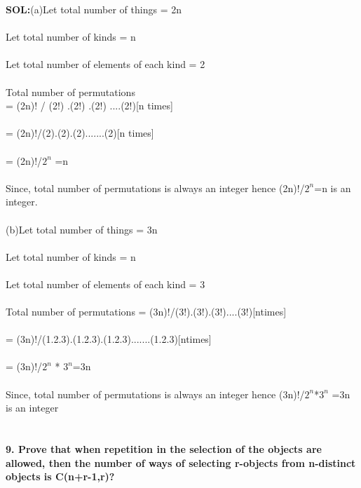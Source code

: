 \documentclass[8pt,a4paper]{article}
\begin{document}
\textbf{SOL:}(a)Let total number of things = 2n\\
\\Let total number of kinds = n\\
\\Let total number of elements of each kind = 2\\
\\Total number of permutations\\ = (2n)! / (2!) .(2!) .(2!) ....(2!)[n times]\\
\\= (2n)!/(2).(2).(2).......(2)[n times]\\
\\= (2n)!/$2^{n}$ =n\\
\\Since, total number of permutations is always an integer hence (2n)!/$2^{n}$=n is an integer.\\
\\(b)Let total number of things = 3n\\
\\Let total number of kinds = n\\
\\Let total number of elements of each kind = 3\\
\\Total number of permutations = (3n)!/(3!).(3!).(3!)....(3!)[ntimes]\\
\\= (3n)!/(1.2.3).(1.2.3).(1.2.3).......(1.2.3)[ntimes]\\
\\= (3n)!/$2^{n}$ * $3^{n}$=3n\\
\\Since, total number of permutations is always an integer hence (3n)!/$2^{n}$*$3^{n}$ =3n is an integer\\

\section{}

\textbf{9. Prove that when repetition in the selection of the objects are allowed, then the number
of ways of selecting r-objects from n-distinct objects is C(n+r-1,r)?}\\
\end{document}
